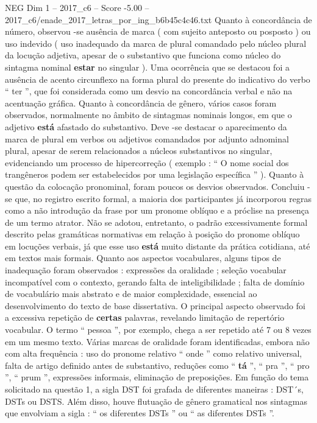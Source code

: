\begin{textsample}{NEG Dim 1 – 2017\_c6 – Score -5.00 – 2017\_c6/enade\_2017\_letras\_por\_ing\_b6b45c4c46.txt}
Quanto à concordância de número, observou -se ausência de marca ( com sujeito anteposto ou posposto ) ou uso indevido ( uso inadequado da marca de plural comandado pelo núcleo plural da locução adjetiva, apesar de o substantivo que funciona como núcleo do sintagma nominal \textbf{estar} no singular ).
Uma ocorrência que se destacou foi a ausência de acento circunflexo na forma plural do presente do indicativo do verbo “ ter ”, que foi considerada como um desvio na concordância verbal e não na acentuação gráfica.
Quanto à concordância de gênero, vários casos foram observados, normalmente no âmbito de sintagmas nominais longos, em que o adjetivo \textbf{está} afastado do substantivo.
Deve -se destacar o aparecimento da marca de plural em verbos ou adjetivos comandados por adjunto adnominal plural, apesar de serem relacionados a núcleos substantivos no singular, evidenciando um processo de hipercorreção ( exemplo : “ O nome social dos trangêneros podem ser estabelecidos por uma legislação específica ” ).
Quanto à questão da colocação pronominal, foram poucos os desvios observados.
Concluiu -se que, no registro escrito formal, a maioria dos participantes já incorporou regras como a não introdução da frase por um pronome oblíquo e a próclise na presença de um termo atrator.
Não se adotou, entretanto, o padrão excessivamente formal descrito pelas gramáticas normativas em relação à posição do pronome oblíquo em locuções verbais, já que esse uso \textbf{está} muito distante da prática cotidiana, até em textos mais formais.
Quanto aos aspectos vocabulares, alguns tipos de inadequação foram observados : expressões da oralidade ; seleção vocabular incompatível com o contexto, gerando falta de inteligibilidade ; falta de domínio de vocabulário mais abstrato e de maior complexidade, essencial ao desenvolvimento do texto de base dissertativa.
O principal aspecto observado foi a excessiva repetição de \textbf{certas} palavras, revelando limitação de repertório vocabular.
O termo “ pessoa ”, por exemplo, chega a ser repetido até 7 ou 8 vezes em um mesmo texto.
Várias marcas de oralidade foram identificadas, embora não com alta frequência : uso do pronome relativo “ onde ” como relativo universal, falta de artigo definido antes de substantivo, reduções como “ \textbf{tá} ”, “ pra ”, “ pro ”, “ prum ”, expressões informais, eliminação de preposições.
Em função do tema solicitado na questão 1, a sigla DST foi grafada de diferentes maneiras : DST´s, DSTs ou DSTS.
Além disso, houve flutuação de gênero gramatical nos sintagmas que envolviam a sigla : “ os diferentes DSTs ” ou “ as diferentes DSTs ”.

\end{textsample}
